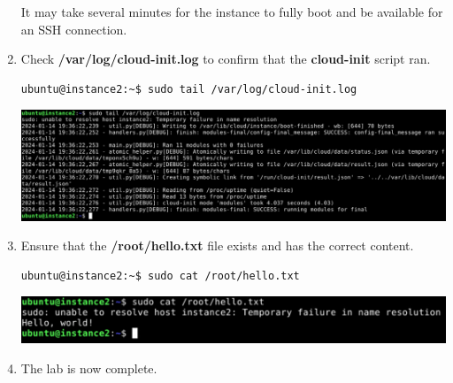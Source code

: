 \documentclass[letterpaper, 12pt]{article}
\begin{document}
\begin{enumerate}
    \begin{notebox}{}
        It may take several minutes for the instance to fully boot and be available for an SSH connection.
    \end{notebox}

    \item Check \textbf{/var/log/cloud-init.log} to confirm that the \textbf{cloud-init} script ran.
\begin{lstlisting}
ubuntu@instance2:~$ sudo tail /var/log/cloud-init.log
\end{lstlisting}

    \begin{center}
        \includegraphics[width=\linewidth]{images/part2/step6.png}
    \end{center}

    \item Ensure that the \textbf{/root/hello.txt} file exists and has the correct content.
\begin{lstlisting}
ubuntu@instance2:~$ sudo cat /root/hello.txt
\end{lstlisting}

    \begin{center}
        \includegraphics[width=\linewidth]{images/part2/step7.png}
    \end{center}

    \item The lab is now complete.

\end{enumerate}
\end{document}
